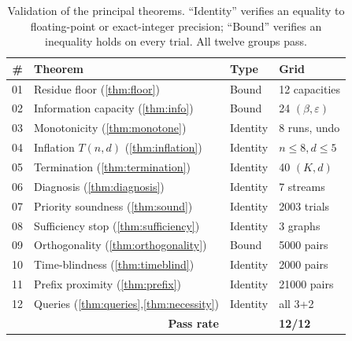 \documentclass[twocolumn,10pt,a4paper]{article}
\theoremstyle{thmstyle}
\theoremstyle{definition}
\theoremstyle{remark}
\newcommand{\floor}{\beta}
\newcommand{\eps}{\varepsilon}
\begin{document}
\begin{table}[h]
\centering\small
\caption{Validation of the principal theorems. ``Identity'' verifies an
equality to floating-point or exact-integer precision; ``Bound'' verifies
an inequality holds on every trial. All twelve groups pass.}
\label{tab:validation}
\begin{tabular}{rlll}
\toprule
\# & Theorem & Type & Grid \\
\midrule
01 & Residue floor (\ref{thm:floor})         & Bound    & 12 capacities \\
02 & Information capacity (\ref{thm:info})    & Bound    & 24 $(\floor,\eps)$ \\
03 & Monotonicity (\ref{thm:monotone})        & Identity & 8 runs, undo \\
04 & Inflation $T(n,d)$ (\ref{thm:inflation}) & Identity & $n{\le}8,d{\le}5$ \\
05 & Termination (\ref{thm:termination})      & Identity & 40 $(K,d)$ \\
06 & Diagnosis (\ref{thm:diagnosis})          & Identity & 7 streams \\
07 & Priority soundness (\ref{thm:sound})     & Identity & 2003 trials \\
08 & Sufficiency stop (\ref{thm:sufficiency}) & Identity & 3 graphs \\
09 & Orthogonality (\ref{thm:orthogonality})  & Bound    & 5000 pairs \\
10 & Time-blindness (\ref{thm:timeblind})     & Identity & 2000 pairs \\
11 & Prefix proximity (\ref{thm:prefix})      & Identity & 21000 pairs \\
12 & Queries (\ref{thm:queries},\ref{thm:necessity}) & Identity & all 3+2 \\
\midrule
\multicolumn{2}{r}{\textbf{Pass rate}} & & \textbf{12/12} \\
\bottomrule
\end{tabular}
\end{table}
\end{document}

